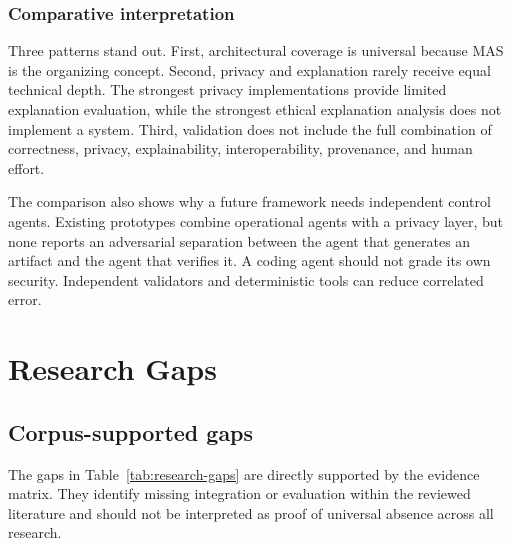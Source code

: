 \documentclass[11pt,a4paper]{article}
\begin{document}
\subsubsection{Comparative interpretation}

Three patterns stand out. First, architectural coverage is universal because MAS is the organizing concept. Second, privacy and explanation rarely receive equal technical depth. The strongest privacy implementations provide limited explanation evaluation, while the strongest ethical explanation analysis does not implement a system. Third, validation does not include the full combination of correctness, privacy, explainability, interoperability, provenance, and human effort.

The comparison also shows why a future framework needs independent control agents. Existing prototypes combine operational agents with a privacy layer, but none reports an adversarial separation between the agent that generates an artifact and the agent that verifies it. A coding agent should not grade its own security. Independent validators and deterministic tools can reduce correlated error.

\section{Research Gaps}

\subsection{Corpus-supported gaps}

The gaps in Table~\ref{tab:research-gaps} are directly supported by the evidence matrix. They identify missing integration or evaluation within the reviewed literature and should not be interpreted as proof of universal absence across all research.
\end{document}
